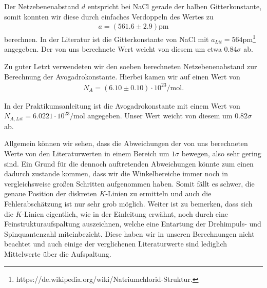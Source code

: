 Der Netzebenenabstand $d$ entspricht bei NaCl gerade der halben Gitterkonstante, somit konnten wir diese durch einfaches Verdoppeln des Wertes zu
\begin{align}
  a = (561.6 \pm 2.9) \si{\pico\meter}
\end{align}
berechnen. In der Literatur ist die Gitterkonstante von NaCl mit $a_{Lit} = 564\si{\pico\meter}$\footnote{https://de.wikipedia.org/wiki/Natriumchlorid-Struktur.} angegeben. Der von uns berechnete Wert weicht von diesem um etwa $0.84\sigma$ ab.

Zu guter Letzt verwendeten wir den soeben berechneten Netzebenenabstand zur Berechnung der Avogadrokonstante. Hierbei kamen wir auf einen Wert von
\begin{align}
  N_A = (6.10 \pm 0.10) \cdot 10^{23} \si{\per\mol}.
\end{align}

In der Praktikumsanleitung ist die Avogadrokonstante mit einem Wert von $N_{A,Lit} = 6.0221 \cdot 10^{23}\si{\per\mol}$ angegeben. Unser Wert weicht von diesem um $0.82\sigma$ ab.

Allgemein können wir sehen, dass die Abweichungen der von uns berechneten Werte von den Literaturwerten in einem Bereich um $1\sigma$ bewegen, also sehr gering sind. Ein Grund für die dennoch auftretenden Abweichungen könnte zum einen dadurch zustande kommen, dass wir die Winkelbereiche immer noch in vergleichsweise großen Schritten aufgenommen haben. Somit fällt es schwer, die genaue Position der diskreten $K$-Linien zu ermitteln und auch die Fehlerabschätzung ist nur sehr grob möglich. Weiter ist zu bemerken, dass sich die $K$-Linien eigentlich, wie in der Einleitung erwähnt, noch durch eine Feinstrukturaufspaltung auszeichnen, welche eine Entartung der Drehimpuls- und Spinquantenzahl miteinbezieht. Diese haben wir in unseren Berechnungen nicht beachtet und auch einige der verglichenen Literaturwerte sind lediglich Mittelwerte über die Aufspaltung.